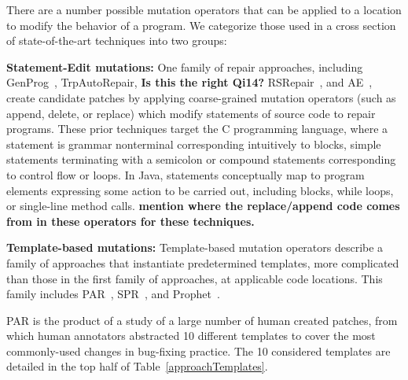 \documentclass[conference]{IEEEtran}
\newcommand{\todo}[1]
  {{\scriptsize \textbf{\color{red} {#1}}}}
\begin{document}
There are a number possible mutation operators that can be applied to a location 
to modify the behavior of a program.  We categorize those used in a cross
section of state-of-the-art techniques into two groups: 

\textbf{Statement-Edit mutations:}
One family of repair approaches, including GenProg~\cite{legoues12}, 
TrpAutoRepair\cite{Qi13},\todo{Is this the right Qi14?} RSRepair~\cite{Qi14}, and AE~\cite{Weimer13},
create candidate 
patches by applying coarse-grained mutation operators (such as append, delete, or 
replace) which modify statements of source code to 
repair programs. These prior techniques target the C programming language, where
a statement is grammar nonterminal corresponding intuitively to blocks,
simple statements terminating
with a semicolon or compound statements corresponding to control flow or
loops. In Java, statements conceptually map to program elements expressing
some action to be carried out, including blocks,  while loops, or single-line
method calls. \todo{mention where the replace/append code comes from in these
  operators for these techniques.}

\textbf{Template-based mutations:}
Template-based mutation operators describe a family of approaches that instantiate
predetermined templates, more complicated than those in the first family of
approaches, at applicable code locations.  This family includes PAR~\cite{kim2013}, 
SPR~\cite{fan15SPR}, and 
Prophet~\cite{Long2016}.

PAR is the product of a study of a large number of 
human 
created patches, from which human annotators abstracted 10 different templates to cover
the most commonly-used changes in bug-fixing practice.
The 10 considered templates are detailed in the top half of Table~\ref{approachTemplates}.
\end{document}
